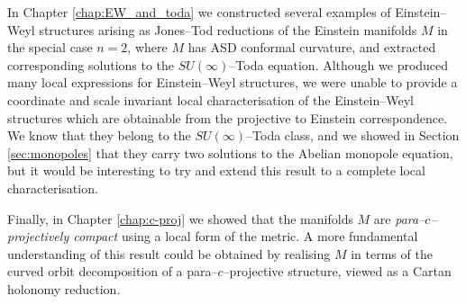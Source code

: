 In Chapter \ref{chap:EW_and_toda} we constructed several examples of Einstein--Weyl structures arising as Jones--Tod reductions of the Einstein manifolds $M$ in the special case $n=2$, where $M$ has ASD conformal curvature, and extracted  corresponding solutions to the $SU(\infty)$--Toda equation. Although we produced many local expressions for Einstein--Weyl structures, we were unable to provide a coordinate and scale invariant local characterisation of the Einstein--Weyl structures which are obtainable from the projective to Einstein correspondence. We know that they belong to the $SU(\infty)$--Toda class, and we showed in Section \ref{sec:monopoles} that they carry two solutions to the Abelian monopole equation, but it would be interesting to try and extend this result to a complete local characterisation.

Finally, in Chapter \ref{chap:c-proj} we showed that the manifolds $M$ are \textit{para--$c$--projectively compact} using a local form of the metric. A more fundamental understanding of this result could be obtained by realising $M$ in terms of the curved orbit decomposition of a para--$c$--projective structure, viewed as a Cartan holonomy reduction.